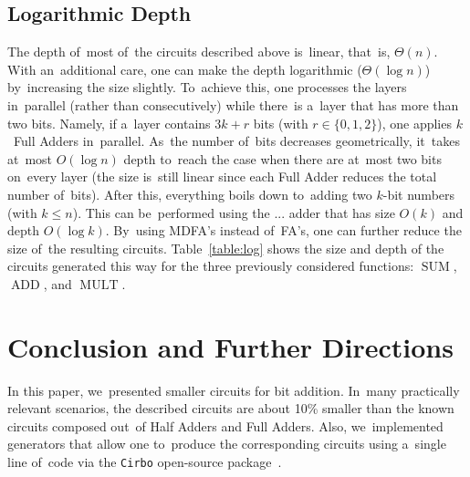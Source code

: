 \documentclass[a4paper, UKenglish, cleveref, autoref,  thm-restate, anonymous]{lipics-v2021}
\DeclareMathOperator{\SUM}{SUM}
\DeclareMathOperator{\ADD}{ADD}
\DeclareMathOperator{\MULT}{MULT}
\begin{document}
    \subsection{Logarithmic Depth}
    The depth of~most of~the circuits described above
    is~linear, that~is, $\Theta(n)$.
    With an~additional care, one can make the depth logarithmic ($\Theta(\log n)$) by~increasing the size slightly.
    To~achieve this, one processes the layers in~parallel (rather than consecutively) while there~is a~layer that has more than two bits. Namely, if a~layer contains $3k+r$ bits (with $r \in \{0,1,2\}$), one applies $k$~Full Adders in~parallel. As~the number of~bits decreases geometrically, it~takes at~most $O(\log n)$ depth to~reach the case when there are at~most two bits on~every layer (the size is~still linear since each Full Adder reduces the total number of~bits). After this, everything boils down to~adding two $k$-bit numbers (with $k \le n$). This can
    be~performed using the ... adder that has size $O(k)$ and depth $O(\log k)$. By~using MDFA's instead of~FA's, one can further reduce the size of~the resulting circuits. Table~\ref{table:log} shows the size and depth of the circuits generated this way for the three previously considered functions: $\SUM$, $\ADD$, and $\MULT$.





    \section{Conclusion and Further Directions}
    In this paper, we~presented smaller circuits for bit addition.
    In~many practically relevant scenarios, the described circuits
    are about 10\% smaller than the known circuits composed
    out~of Half Adders and Full Adders.
    Also, we~implemented generators that allow one
    to~produce the corresponding circuits using a~single line of~code
    via the \texttt{Cirbo} open-source package~\cite{DBLP:conf/aaai/AverkovBEGKKKLL25}.
\end{document}
